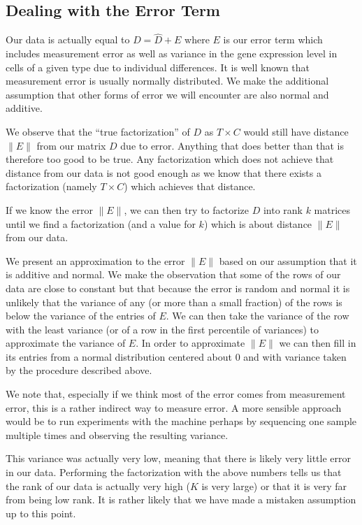 \documentclass[10pt]{article}
\begin{document}
\subsection{Dealing with the Error Term}
Our data is actually equal to \(D = \hat{D} + E\) where \(E\) is our error term which includes measurement error as well as variance in the gene expression level in cells of a given type due to individual differences.
It is well known that measurement error is usually normally distributed.
We make the additional assumption that other forms of error we will encounter are also normal and additive.

We observe that the ``true factorization'' of \(D\) as \(T \times C\) would still have distance \(\|E\|\) from our matrix \(D\) due to error.
Anything that does better than that is therefore too good to be true.
Any factorization which does not achieve that distance from our data is not good enough as we know that there exists a factorization (namely \(T \times C\)) which achieves that distance.

If we know the error \(\|E\|\), we can then try to factorize \(D\) into rank \(k\) matrices until we find a factorization (and a value for \(k\)) which is about distance \(\|E\|\) from our data.

We present an approximation to the error \(\|E\|\) based on our assumption that it is additive and normal.
We make the observation that some of the rows of our data are close to constant but that because the error is random and normal it is unlikely that the variance of any (or more than a small fraction) of the rows is below the variance of the entries of \(E\).
We can then take the variance of the row with the least variance (or of a row in the first percentile of variances) to approximate the variance of \(E\).
In order to approximate \(\|E\|\) we can then fill in its entries from a normal distribution centered about \(0\) and with variance taken by the procedure described above.

We note that, especially if we think most of the error comes from measurement error, this is a rather indirect way to measure error.
A more sensible approach would be to run experiments with the machine perhaps by sequencing one sample multiple times and observing the resulting variance.

This variance was actually very low, meaning that there is likely very little error in our data.
Performing the factorization with the above numbers tells us that the rank of our data is actually very high (\(K\) is very large) or that it is very far from being low rank.
It is rather likely that we have made a mistaken assumption up to this point.
\end{document}
